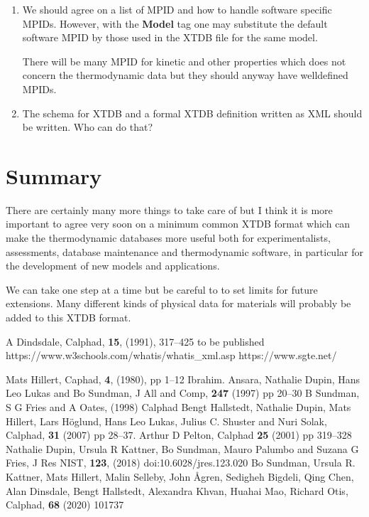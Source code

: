 \documentclass{article}
\begin{document}
\begin{enumerate}
\item We should agree on a list of MPID and how to handle software
  specific MPIDs.  However, with the {\bf Model} tag one may
  substitute the default software MPID by those used in the XTDB file
  for the same model.

  There will be many MPID for kinetic and other properties which does
  not concern the thermodynamic data but they should anyway have
  welldefined MPIDs.

\item The schema for XTDB and a formal XTDB definition written as XML
  should be written.  Who can do that?
  
\end{enumerate}

\section{Summary}

There are certainly many more things to take care of but I think it is
more important to agree very soon on a minimum common XTDB format
which can make the thermodynamic databases more useful both for
experimentalists, assessments, database maintenance and thermodynamic
software, in particular for the development of new models and
applications.

We can take one step at a time but be careful to to set limits for
future extensions.  Many different kinds of physical data for
materials will probably be added to this XTDB format.

\begin{thebibliography}{00Zzzz}
 A Dindsdale, Calphad, {\bf 15}, (1991), 317--425
 to be published
 https://www.w3schools.com/whatis/whatis\_xml.asp
 https://www.sgte.net/

 Mats Hillert,  Caphad, {\bf 4}, (1980), pp 1--12
 Ibrahim. Ansara, Nathalie Dupin, Hans Leo Lukas and Bo Sundman,
  J All and Comp, {\bf 247} (1997) pp 20--30
 B Sundman, S G Fries and A Oates, (1998) Calphad
 Bengt Hallstedt, Nathalie Dupin, Mats Hillert, Lars
  H{\"o}glund, Hans Leo Lukas, Julius C. Shuster and Nuri Solak,
  Calphad, {\bf 31} (2007) pp 28--37.
 Arthur D Pelton, Calphad {\bf 25} (2001) pp 319--328
 Nathalie Dupin, Ursula R Kattner, Bo Sundman, Mauro
  Palumbo and Suzana G Fries, J Res NIST, {\bf 123}, (2018)
  doi:10.6028/jres.123.020
 Bo Sundman, Ursula R. Kattner, Mats Hillert, Malin
  Selleby, John Ågren, Sedigheh Bigdeli, Qing Chen, Alan Dinsdale,
  Bengt Hallstedt, Alexandra Khvan, Huahai Mao, Richard Otis, Calphad,
  {\bf 68} (2020) 101737
\end{thebibliography}
\end{document}
